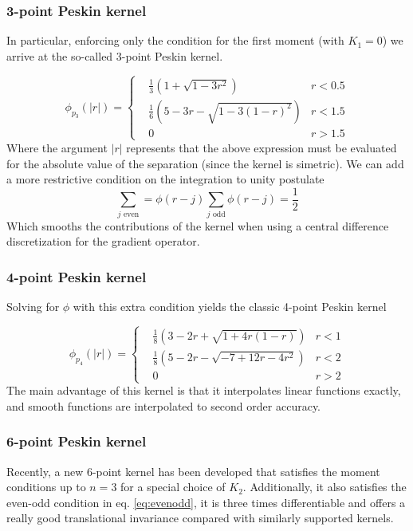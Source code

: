 \documentclass[ twoside,openright,titlepage,numbers=noenddot,%
headinclude,footinclude,cleardoublepage=empty,abstract=on,
BCOR=5mm,paper=a4,fontsize=11pt, dvipsnames
]{scrreprt}
\newcommand{\half}{\frac{1}{2}}
\begin{document}
\subsubsection*{3-point Peskin kernel}
In particular, enforcing only the condition for the first moment (with $K_1=0$) we arrive at the so-called 3-point Peskin kernel.

\begin{equation}
  \label{eq:peskin3}
  \phi_{p_3}(|r|) =  \left\{
  \begin{aligned}
    & \frac{1}{3}\left( 1 + \sqrt{1-3r^2}\right)& r < 0.5\\
    & \frac{1}{6}\left(5-3r-\sqrt{1-3(1-r)^2}\right)& r < 1.5\\
    & 0 & r>1.5 
  \end{aligned}\right.
\end{equation}
Where the argument $|r|$ represents that the above expression must be evaluated for the absolute value of the separation (since the kernel is simetric).
We can add a more restrictive condition on the integration to unity postulate
\begin{equation}
  \label{eq:evenodd}
  \sum_{j \textrm{ even}} =\phi(r-j)   \sum_{j \textrm{ odd}} \phi(r-j) = \half
\end{equation}
Which smooths the contributions of the kernel when using a central difference discretization for the gradient operator.
\subsubsection*{4-point Peskin kernel}
Solving for $\phi$ with this extra condition yields the classic 4-point Peskin kernel

\begin{equation}
  \label{eq:peskin4}
  \phi_{p_4}(|r|) =  \left\{
  \begin{aligned}
    & \frac{1}{8}\left( 3 - 2r + \sqrt{1+4r(1-r)}\right)& r < 1\\
    & \frac{1}{8}\left(5-2r-\sqrt{-7+12r-4r^2}\right)& r < 2\\
    & 0 & r>2
  \end{aligned}\right.
\end{equation}
The main advantage of this kernel is that it interpolates linear functions exactly, and smooth functions are interpolated to second order accuracy.

\subsubsection*{6-point Peskin kernel}
Recently, a new 6-point kernel has been developed that satisfies the moment conditions up to $n=3$ for a special choice of $K_2$\cite{Bao2016}. Additionally, it also satisfies the even-odd condition in eq. \eqref{eq:evenodd}, it is three times differentiable and offers a really good translational invariance compared with similarly supported kernels.
\end{document}
